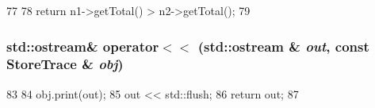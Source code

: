 \begin{DoxyCode}
77 {
78     return n1->getTotal() > n2->getTotal();
79 }
\end{DoxyCode}
\hypertarget{StoreTrace_8hh_a456db4dc629df86f8a035676fd294345}{
\subsubsection[{operator$<$$<$}]{\setlength{\rightskip}{0pt plus 5cm}std::ostream\& operator$<$$<$ (std::ostream \& {\em out}, \/  const {\bf StoreTrace} \& {\em obj})}}
\label{StoreTrace_8hh_a456db4dc629df86f8a035676fd294345}



\begin{DoxyCode}
83 {
84     obj.print(out);
85     out << std::flush;
86     return out;
87 }
\end{DoxyCode}
